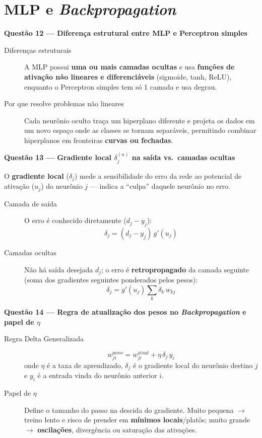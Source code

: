 \documentclass[10pt,a4paper]{article}
\newcommand{\questao}[2]{%
  \needspace{4\baselineskip}%
  \vspace{0.45em}\noindent
  {\color{azulufersa}\bfseries Questão #1 --- #2}\par\nopagebreak\vspace{0.15em}\noindent\ignorespaces%
}
\begin{document}
\section{MLP e \emph{Backpropagation}}

\questao{12}{Diferença estrutural entre MLP e Perceptron simples}
\begin{description}
  \item[Diferenças estruturais] A MLP possui \textbf{uma ou mais camadas ocultas} e usa \textbf{funções de ativação não lineares e diferenciáveis} (sigmoide, tanh, ReLU), enquanto o Perceptron simples tem só 1 camada e usa degrau.
  \item[Por que resolve problemas não lineares] Cada neurônio oculto traça um hiperplano diferente e projeta os dados em um novo espaço onde as classes se tornam separáveis, permitindo combinar hiperplanos em fronteiras \textbf{curvas ou fechadas}.
\end{description}

\questao{13}{Gradiente local $\delta_j^{(n)}$ na saída vs.\ camadas ocultas}
O \textbf{gradiente local} ($\delta_j$) mede a sensibilidade do erro da rede ao potencial de ativação ($u_j$) do neurônio $j$ --- indica a \enquote{culpa} daquele neurônio no erro.
\begin{description}
  \item[Camada de saída] O erro é conhecido diretamente ($d_j - y_j$):
  \[
    \delta_j = (d_j - y_j)\,g'(u_j)
  \]
  \item[Camadas ocultas] Não há saída desejada $d_j$; o erro é \textbf{retropropagado} da camada seguinte (soma dos gradientes seguintes ponderados pelos pesos):
  \[
    \delta_j = g'(u_j)\sum_{k} \delta_k\,w_{kj}
  \]
\end{description}

\questao{14}{Regra de atualização dos pesos no \emph{Backpropagation} e papel de $\eta$}
\begin{description}
  \item[Regra Delta Generalizada]
  \[
    w_{ji}^{\text{novo}} = w_{ji}^{\text{atual}} + \eta\,\delta_j\,y_i
  \]
  onde $\eta$ é a taxa de aprendizado, $\delta_j$ é o gradiente local do neurônio destino $j$ e $y_i$ é a entrada vinda do neurônio anterior $i$.
  \item[Papel de $\eta$] Define o tamanho do passo na descida do gradiente. Muito pequena $\to$ treino lento e risco de prender em \textbf{mínimos locais}/platôs; muito grande $\to$ \textbf{oscilações}, divergência ou saturação das ativações.
\end{description}
\end{document}

